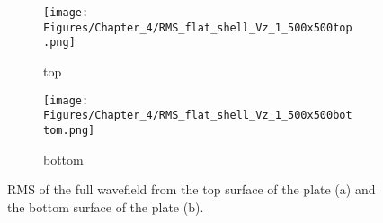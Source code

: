 \begin{figure} [!h]
	\centering
	\begin{subfigure}[b]{0.47\textwidth}
		\centering
		\texttt{[image: Figures/Chapter\_4/RMS\_flat\_shell\_Vz\_1\_500x500top.png]}
		\caption{top}
		\label{fig:rmstop}
	\end{subfigure}
	\hfill
	\begin{subfigure}[b]{0.47\textwidth}
		\centering
		\texttt{[image: Figures/Chapter\_4/RMS\_flat\_shell\_Vz\_1\_500x500bottom.png]}
		\caption{bottom}
		\label{fig:rmsbottom}
	\end{subfigure}
	\caption{RMS of the full wavefield from the top surface of the plate (a) and the bottom surface of the plate (b).}
	\label{fig:rms}
\end{figure} 
\newpage